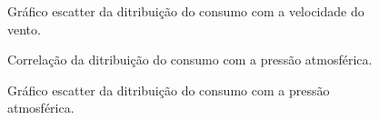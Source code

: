 \documentclass[	12pt, Times, openright, twoside, a4paper, english, brazil]{abntex2}
\begin{document}
                \begin{figure}[!ht]
                	\caption{Gráfico escatter da ditribuição do consumo com a velocidade do vento. \label{fig:case1_vento_scatter} }
                \end{figure}
                 \begin{figure}[!ht]
                    	\caption{Correlação da ditribuição do consumo com a pressão atmosférica. \label{fig:case1_pressao} }
                    \end{figure}
                
                \begin{figure}[!ht]
                	\caption{Gráfico escatter da ditribuição do consumo com a pressão atmosférica. \label{fig:case1_pressao_scatter} }
                \end{figure}
\end{document}
